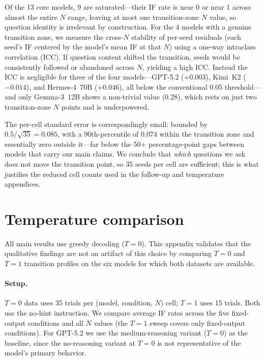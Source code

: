 Of the 13 core models, 9 are saturated---their IF rate is near 0 or near 1 across almost the entire $N$ range, leaving at most one transition-zone $N$ value, so question identity is irrelevant by construction. For the 4 models with a genuine transition zone, we measure the cross-$N$ stability of per-seed residuals (each seed's IF centered by the model's mean IF at that $N$) using a one-way intraclass correlation (ICC). If question content shifted the transition, seeds would be consistently followed or abandoned across $N$, yielding a high ICC. Instead the ICC is negligible for three of the four models---GPT-5.2 ($+0.003$), Kimi~K2 ($-0.014$), and Hermes-4~70B ($+0.046$), all below the conventional 0.05 threshold---and only Gemma-3~12B shows a non-trivial value (0.28), which rests on just two transition-zone $N$ points and is underpowered.

The per-cell standard error is correspondingly small: bounded by $0.5/\sqrt{35}=0.085$, with a 90th-percentile of 0.074 within the transition zone and essentially zero outside it---far below the 50+ percentage-point gaps between models that carry our main claims. We conclude that \emph{which} questions we ask does not move the transition point, so 35 seeds per cell are sufficient; this is what justifies the reduced cell counts used in the follow-up and temperature appendices.

\section{Temperature comparison}
\label{app:temperature}



All main results use greedy decoding ($T{=}0$). This appendix validates that the qualitative findings are not an artifact of this choice by comparing $T{=}0$ and $T{=}1$ transition profiles on the six models for which both datasets are available.

\paragraph{Setup.}
$T{=}0$ data uses 35 trials per (model, condition, $N$) cell; $T{=}1$ uses 15 trials. Both use the no-hint instruction. We compare average IF rates across the five fixed-output conditions and all $N$ values (the $T{=}1$ sweep covers only fixed-output conditions). For GPT-5.2 we use the medium-reasoning variant ($T{=}0$) as the baseline, since the no-reasoning variant at $T{=}0$ is not representative of the model's primary behavior.

